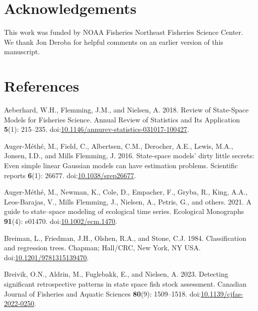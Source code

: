 \documentclass[
  12pt,
]{article}
\newlength{\cslhangindent}
\newenvironment{CSLReferences}[2] %
 {\begin{list}{}{%
  \setlength{\itemindent}{0pt}
  \setlength{\leftmargin}{0pt}
  \setlength{\parsep}{0pt}
  \ifodd #1
   \setlength{\leftmargin}{\cslhangindent}
   \setlength{\itemindent}{-1\cslhangindent}
  \fi
  \setlength{\itemsep}{#2\baselineskip}}}
 {\end{list}}
\begin{document}
\section*{Acknowledgements}\label{acknowledgements}

This work was funded by NOAA Fisheries Northeast Fisheries Science
Center. We thank Jon Deroba for helpful comments on an earlier version
of this manuscript.

\pagebreak

\section*{References}\label{references}

\label{refs}
\begin{CSLReferences}{1}{0}
Aeberhard, W.H., Flemming, J.M., and Nielsen, A. 2018. Review of
{State}-{Space Models} for {Fisheries Science}. Annual Review of
Statistics and Its Application \textbf{5}(1): 215--235.
doi:\href{https://doi.org/10.1146/annurev-statistics-031017-100427}{10.1146/annurev-statistics-031017-100427}.

Auger-Méthé, M., Field, C., Albertsen, C.M., Derocher, A.E., Lewis,
M.A., Jonsen, I.D., and Mills Flemming, J. 2016. State-space models'
dirty little secrets: Even simple linear {G}aussian models can have
estimation problems. Scientific reports \textbf{6}(1): 26677.
doi:\href{https://doi.org/10.1038/srep26677}{10.1038/srep26677}.

Auger-Méthé, M., Newman, K., Cole, D., Empacher, F., Gryba, R., King,
A.A., Leos-Barajas, V., Mills Flemming, J., Nielsen, A., Petris, G., and
others. 2021. A guide to state--space modeling of ecological time
series. Ecological Monographs \textbf{91}(4): e01470.
doi:\href{https://doi.org/10.1002/ecm.1470}{10.1002/ecm.1470}.

Breiman, L., Friedman, J.H., Olshen, R.A., and Stone, C.J. 1984.
Classification and regression trees. Chapman; Hall/CRC, New York, NY
USA.
doi:\href{https://doi.org/10.1201/9781315139470}{10.1201/9781315139470}.

Breivik, O.N., Aldrin, M., Fuglebakk, E., and Nielsen, A. 2023.
Detecting significant retrospective patterns in state space fish stock
assessment. Canadian Journal of Fisheries and Aquatic Sciences
\textbf{80}(9): 1509--1518.
doi:\href{https://doi.org/10.1139/cjfas-2022-0250}{10.1139/cjfas-2022-0250}.


\end{CSLReferences}
\end{document}
